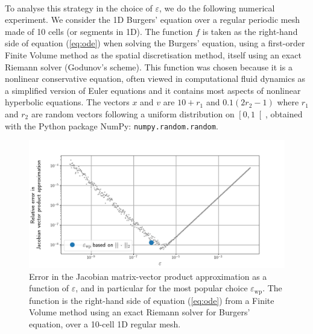       \paragraph{}
      To analyse this strategy in the choice of $\varepsilon$, we do the following numerical experiment.
      We consider the 1D Burgers' equation over a regular periodic mesh made of 10 cells (or segments in 1D).
      The function $f$ is taken as the right-hand side of equation (\ref{eq:ode}) when solving the Burgers' equation, using a first-order Finite Volume method as the spatial discretisation method, itself using an exact Riemann solver (Godunov's scheme).
      This function was chosen because it is a nonlinear conservative equation, often viewed in computational fluid dynamics as a simplified version of Euler equations and it contains most aspects of nonlinear hyperbolic equations.
      The vectors $x$ and $v$ are $10 + r_1$ and $0.1 \left(2 r_2 - 1\right)$ where $r_1$ and $r_2$ are random vectors following a uniform distribution on $\left[0, 1\right[$, obtained with the Python package NumPy: \texttt{numpy.random.random}.

      \begin{figure}
        \centering
        \includegraphics[width=\textwidth]{figures/epsilon_Burgers_10.png}
        \caption{
          Error in the Jacobian matrix-vector product approximation as a function of $\varepsilon$, and in particular for the most popular choice $\varepsilon_\textrm{wp}$.
          The function is the right-hand side of equation (\ref{eq:ode}) from a Finite Volume method using an exact Riemann solver for Burgers' equation, over a 10-cell 1D regular mesh.
        }
        \label{fig:epsilon_burgers_10}
      \end{figure}

